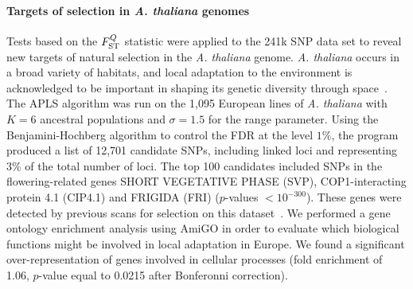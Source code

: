 \paragraph{Targets of selection in {\it A. thaliana} genomes} Tests based on the
$F^Q_{\rm ST}$ statistic were applied to the 241k SNP data set to reveal new
targets of natural selection in the {\it A. thaliana} genome. {\it A. thaliana}
occurs in a broad variety of habitats, and local adaptation to the environment
is acknowledged to be important in shaping its genetic diversity through
space~\citep{Hancock2011, Fournier-Level2011}. The APLS algorithm was run on the
1,095 European lines of {\it A. thaliana} with $K=6$ ancestral populations and
$\sigma = 1.5$ for the range parameter. Using the Benjamini-Hochberg algorithm to
control the FDR at the level $1\%$, the program produced a list of 12,701
candidate SNPs, including linked loci and representing 3\% of the total number
of loci. The top 100 candidates included SNPs in the flowering-related genes
SHORT VEGETATIVE PHASE (SVP), COP1-interacting protein 4.1 (CIP4.1) and FRIGIDA
(FRI) ($p$-values $< 10^{-300}$). These genes were detected by previous scans
for selection on this dataset~\citep{Horton2012}. We performed a gene ontology
enrichment analysis using AmiGO in order to evaluate which biological functions
might be involved in local adaptation in Europe. We found a significant
over-representation of genes involved in cellular processes (fold enrichment of
1.06, $p$-value equal to 0.0215 after Bonferonni correction).


